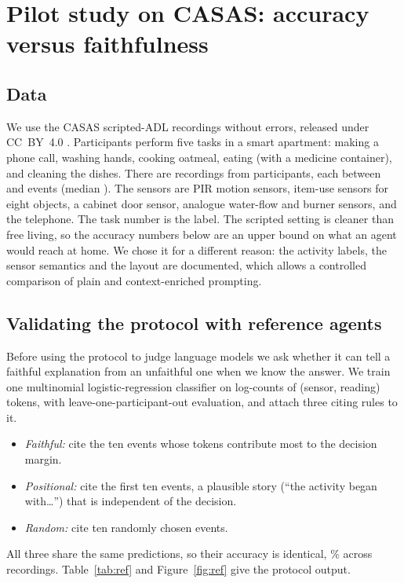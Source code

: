 \documentclass[11pt,a4paper]{article}
\begin{document}
\section{Pilot study on CASAS: accuracy versus faithfulness}
\label{sec:pilot}

\subsection{Data}
We use the CASAS scripted-ADL recordings without errors, released under CC~BY~4.0 \cite{casas_zenodo_adl}. Participants perform five tasks in a smart apartment: making a phone call, washing hands, cooking oatmeal, eating (with a medicine container), and cleaning the dishes. There are \NRec{} recordings from \NPart{} participants, each between \NEvMin{} and \NEvMax{} events (median \NEvMed). The sensors are PIR motion sensors, item-use sensors for eight objects, a cabinet door sensor, analogue water-flow and burner sensors, and the telephone. The task number is the label. The scripted setting is cleaner than free living, so the accuracy numbers below are an upper bound on what an agent would reach at home. We chose it for a different reason: the activity labels, the sensor semantics and the layout are documented, which allows a controlled comparison of plain and context-enriched prompting.

\subsection{Validating the protocol with reference agents}
\label{sec:reference}
Before using the protocol to judge language models we ask whether it can tell a faithful explanation from an unfaithful one when we know the answer. We train one multinomial logistic-regression classifier on log-counts of (sensor, reading) tokens, with leave-one-participant-out evaluation, and attach three citing rules to it.
\begin{itemize}[nosep]
\item \emph{Faithful:} cite the ten events whose tokens contribute most to the decision margin.
\item \emph{Positional:} cite the first ten events, a plausible story (``the activity began with\dots'') that is independent of the decision.
\item \emph{Random:} cite ten randomly chosen events.
\end{itemize}
All three share the same predictions, so their accuracy is identical, \AccFaith\% across \NRec{} recordings. Table~\ref{tab:ref} and Figure~\ref{fig:ref} give the protocol output.
\end{document}
